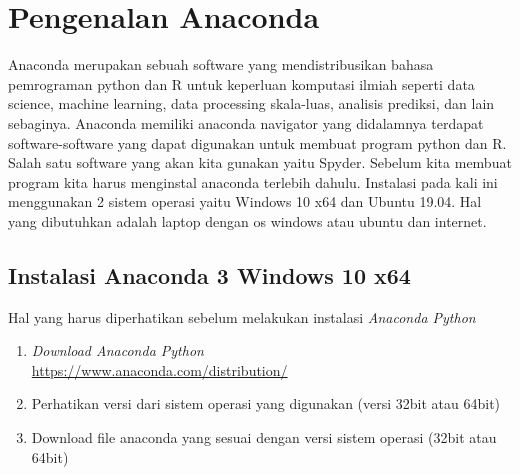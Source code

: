 \section{Pengenalan Anaconda}
Anaconda merupakan sebuah software yang mendistribusikan bahasa pemrograman python dan R untuk keperluan komputasi ilmiah seperti data science, machine learning, data processing skala-luas, analisis prediksi, dan lain sebaginya.
Anaconda memiliki anaconda navigator yang didalamnya terdapat software-software yang dapat digunakan untuk membuat program python dan R. Salah satu software yang akan kita gunakan yaitu Spyder. Sebelum kita membuat program kita harus menginstal anaconda terlebih dahulu.
Instalasi pada kali ini menggunakan 2 sistem operasi yaitu Windows 10 x64 dan Ubuntu 19.04. Hal yang dibutuhkan adalah laptop dengan os windows atau ubuntu dan internet.
\subsection{Instalasi Anaconda 3 Windows 10 x64}
Hal yang harus diperhatikan sebelum melakukan instalasi \textit{Anaconda Python}
\begin{enumerate}
 \item \textit{Download Anaconda Python} \\ \small \url{https://www.anaconda.com/distribution/}
 \item Perhatikan versi dari sistem operasi yang digunakan (versi 32bit atau 64bit)
 \item Download file anaconda yang sesuai dengan versi sistem operasi (32bit atau 64bit)
\end{enumerate}

